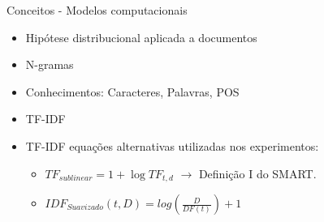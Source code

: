 \begin{frame}{Conceitos - Modelos computacionais}
\begin{tcolorbox}[title=Modelo tradicional de representação textual,valign=center]\selectFont
	\begin{itemize}
		\item Hipótese distribucional aplicada a documentos \cite{Turney2010}
		\item N-gramas
		\item Conhecimentos: Caracteres, Palavras, POS
		\item TF-IDF
		\item TF-IDF equações alternativas utilizadas nos experimentos:
			\begin{itemize}
				\item $ TF_{sublinear} = 1 + \log TF_{t,d}$  $\longrightarrow$ Definição I do SMART. 
				\item $
				IDF_{Suavizado}(t,D) = log\left (
				\frac{D}{DF(t)}
				\right ) + 1
				$
			\end{itemize}
	\end{itemize}	
\end{tcolorbox}
\end{frame}


